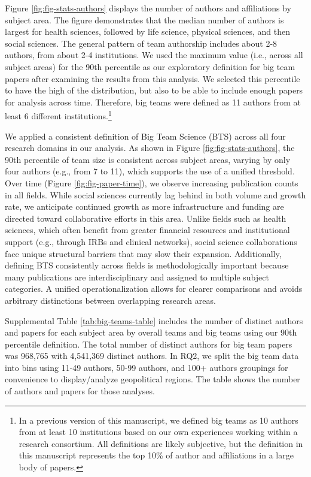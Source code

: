 \documentclass[
  man,floatsintext]{apa7}
\begin{document}
Figure \ref{fig:fig-stats-authors} displays the number of authors and
affiliations by subject area. The figure demonstrates that the median
number of authors is largest for health sciences, followed by life
science, physical sciences, and then social sciences. The general
pattern of team authorship includes about 2-8 authors, from about 2-4
institutions. We used the maximum value (i.e., across all subject areas)
for the 90th percentile as our exploratory definition for big team
papers after examining the results from this analysis. We selected this
percentile to have the high of the distribution, but also to be able to
include enough papers for analysis across time. Therefore, big teams
were defined as 11 authors from at least 6 different institutions.\footnote{In a previous version of this manuscript, we defined big teams as
  10 authors from at least 10 institutions based on our own
  experiences working within a research consortium. All definitions
  are likely subjective, but the definition in this manuscript
  represents the top 10\% of author and affiliations in a large body of
  papers.}

We applied a consistent definition of Big Team Science (BTS) across all four research domains in our analysis. As shown in Figure \ref{fig:fig-stats-authors}, the 90th percentile of team size is consistent across subject areas, varying by only four authors (e.g., from 7 to 11), which supports the use of a unified threshold. Over time (Figure \ref{fig:fig-paper-time}), we observe increasing publication counts in all fields. While social sciences currently lag behind in both volume and growth rate, we anticipate continued growth as more infrastructure and funding are directed toward collaborative efforts in this area. Unlike fields such as health sciences, which often benefit from greater financial resources and institutional support (e.g., through IRBs and clinical networks), social science collaborations face unique structural barriers that may slow their expansion. Additionally, defining BTS consistently across fields is methodologically important because many publications are interdisciplinary and assigned to multiple subject categories. A unified operationalization allows for clearer comparisons and avoids arbitrary distinctions between overlapping research areas.

Supplemental Table \ref{tab:big-teams-table} includes the number of
distinct authors and papers for each subject area by overall teams and
big teams using our 90th percentile definition. The total number of
distinct authors for big team papers was 968,765 with
4,541,369 distinct authors. In RQ2, we split the big team
data into bins using 11-49 authors, 50-99 authors, and 100+ authors groupings for convenience to display/analyze geopolitical regions. The
table shows the number of authors and papers for those analyses.
\end{document}

